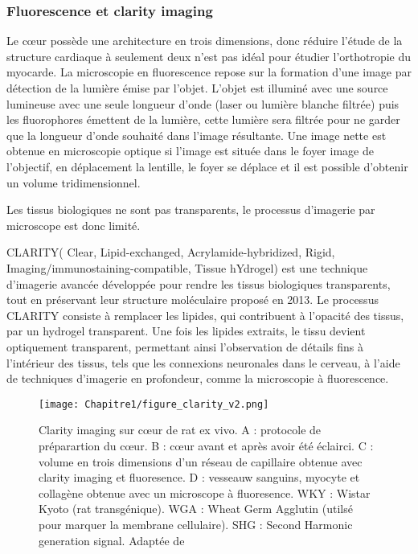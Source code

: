 \subsubsection{Fluorescence et clarity imaging}

Le cœur possède une architecture en trois dimensions, donc réduire l’étude de la structure cardiaque à seulement deux n’est pas idéal pour étudier l’orthotropie du myocarde. La microscopie en fluorescence repose sur la formation d’une image par détection de la lumière émise par l’objet. L’objet est illuminé avec une source lumineuse avec une seule longueur d’onde (laser ou lumière blanche filtrée) puis les fluorophores émettent de la lumière, cette lumière sera filtrée pour ne garder que la longueur d’onde souhaité dans l’image résultante. Une image nette est obtenue en microscopie optique si l’image est située dans le foyer image de l’objectif, en déplacement la lentille, le foyer se déplace et il est possible d’obtenir un volume tridimensionnel.

Les tissus biologiques ne sont pas transparents, le processus d’imagerie par microscope est donc limité.

CLARITY( Clear, Lipid-exchanged, Acrylamide-hybridized, Rigid, Imaging/immunostaining-compatible, Tissue hYdrogel) \cite{Du_2018} est une technique d'imagerie avancée développée pour rendre les tissus biologiques transparents, tout en préservant leur structure moléculaire proposé en 2013. Le processus CLARITY consiste à remplacer les lipides, qui contribuent à l'opacité des tissus, par un hydrogel transparent. Une fois les lipides extraits, le tissu devient optiquement transparent, permettant ainsi l'observation de détails fins à l'intérieur des tissus, tels que les connexions neuronales dans le cerveau, à l'aide de techniques d'imagerie en profondeur, comme la microscopie à fluorescence.

\begin{figure}[!htbp]
  \begin{center}
    \texttt{[image: Chapitre1/figure\_clarity\_v2.png]}
     \end{center}
    \caption{Clarity imaging sur cœur de rat ex vivo. A : protocole de préparartion du cœur. B : cœur avant et après avoir été éclairci. C : volume en trois dimensions d’un réseau de capillaire obtenue avec clarity imaging et fluoresence. D : vesseauw sanguins, myocyte et collagène obtenue avec un microscope à fluoresence. WKY : Wistar Kyoto (rat transgénique). WGA : Wheat Germ Agglutin (utilsé pour marquer la membrane cellulaire). SHG : Second Harmonic generation signal.  Adaptée de \cite{Olianti_2020}}
  \label{fig:clarity}
\end{figure}

